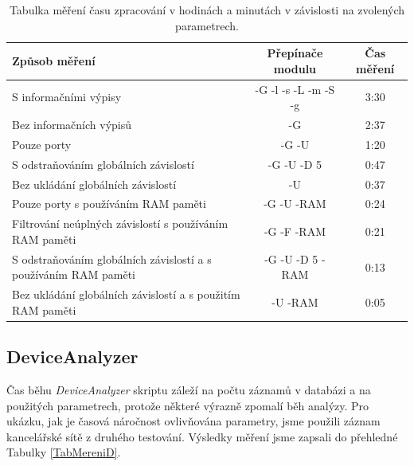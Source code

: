 \documentclass[thesis=B,czech,hidelinks]{FITthesis}[2019/03/21]
\begin{document}
    
    \begin{table}[h]\centering
 	    \caption[Tabulka časových měření: PassiveAutodiscovery modul]{Tabulka měření času zpracování v hodinách a minutách v závislosti na zvolených parametrech.}\label{TabMereni}
 	    \begin{tabular}{|>{\centering}m{5.5cm}|c|c|}\hline
 		\textbf{Způsob měření}		                    & \textbf{Přepínače modulu} & \textbf{Čas měření} \tabularnewline \hline \hline
 		S informačními výpisy		            & 	-G -l -s -L -m -S -g	& 3:30	\tabularnewline \hline
 		Bez informačních výpisů		            & 	-G	                    & 2:37	\tabularnewline \hline
 	    Pouze \uv{běžné} porty		            & 	-G -U                   & 1:20	\tabularnewline \hline
 	    S odstraňováním globálních závislostí 	& 	-G -U -D 5              & 0:47	\tabularnewline \hline
 	    Bez ukládání globálních závislostí      &   -U                      & 0:37	\tabularnewline \hline
 	    Pouze \uv{běžné} porty s používáním RAM paměti    &   -G -U -RAM    & 0:24	\tabularnewline \hline
 	    Filtrování neúplných závislostí s používáním RAM paměti  & 	-G -F -RAM              & 0:21	\tabularnewline \hline
 	    S odstraňováním globálních závislostí a s používáním RAM paměti 	& 	-G -U -D 5 -RAM & 0:13	\tabularnewline \hline
 	    Bez ukládání globálních závislostí a s použitím RAM paměti   &   -U -RAM & 0:05	\tabularnewline \hline
 	    \end{tabular}
    \end{table}
    \newpage
    \subsection{DeviceAnalyzer}
    Čas běhu \emph{DeviceAnalyzer} skriptu záleží na počtu záznamů v databázi a na použitých parametrech, protože některé výrazně zpomalí běh analýzy. Pro ukázku, jak je časová náročnost ovlivňována parametry, jsme použili záznam kancelářské sítě z druhého testování. Výsledky měření jsme zapsali do přehledné Tabulky \ref{TabMereniD}.
    
\end{document}

